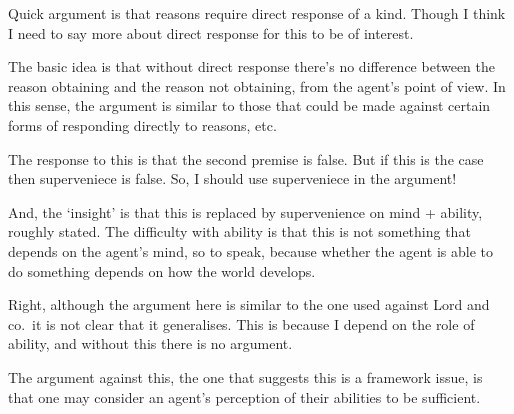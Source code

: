 \documentclass[10pt]{article}
\begin{document}
\begin{note}
  Quick argument is that reasons require direct response of a kind.
  Though I think I need to say more about direct response for this to be of interest.

  The basic idea is that without direct response there's no difference between the reason obtaining and the reason not obtaining, from the agent's point of view.
  In this sense, the argument is similar to those that could be made against certain forms of responding directly to reasons, etc.

  The response to this is that the second premise is false.
  But if this is the case then superveniece is false.
  So, I should use superveniece in the argument!

  And, the `insight' is that this is replaced by supervenience on mind + ability, roughly stated.
  The difficulty with ability is that this is not something that depends on the agent's mind, so to speak, because whether the agent is able to do something depends on how the world develops.

  Right, although the argument here is similar to the one used against Lord and co.\ it is not clear that it generalises.
  This is because I depend on the role of ability, and without this there is no argument.

  The argument against this, the one that suggests this is a framework issue, is that one may consider an agent's perception of their abilities to be sufficient.
\end{note}
\end{document}

